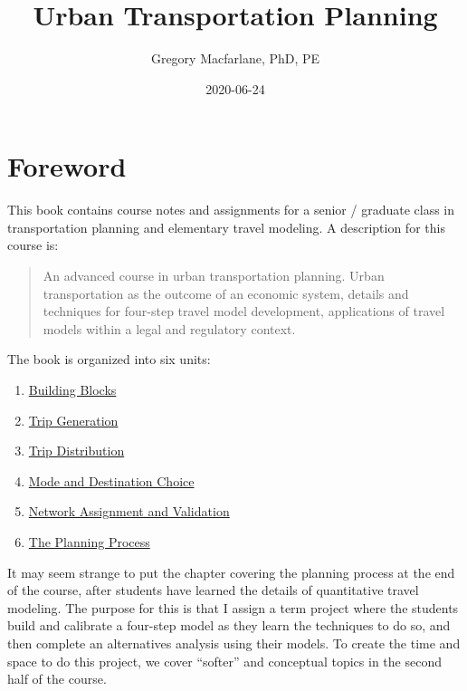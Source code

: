 \documentclass[
]{book}
\title{Urban Transportation Planning}
\author{Gregory Macfarlane, PhD, PE}
\date{2020-06-24}
\providecommand{\tightlist}{%
  \setlength{\itemsep}{0pt}\setlength{\parskip}{0pt}}
\begin{document}
\maketitle

{
\setcounter{tocdepth}{1}
\tableofcontents
}
\hypertarget{syllabus}{%
\chapter*{Foreword}\label{syllabus}}

This book contains course notes and assignments for a senior / graduate class in
transportation planning and elementary travel modeling. A description for this course
is:

\begin{quote}
An advanced course in urban transportation planning. Urban transportation as
the outcome of an economic system, details and techniques for four-step travel
model development, applications of travel models within a legal and regulatory
context.
\end{quote}

The book is organized into six units:

\begin{enumerate}
\def\labelenumi{\arabic{enumi}.}
\tightlist
\item
  \protect\hyperlink{chap-blocks}{Building Blocks}
\item
  \protect\hyperlink{chap-tripgen}{Trip Generation}
\item
  \protect\hyperlink{chap-distribution}{Trip Distribution}
\item
  \protect\hyperlink{chap-modechoice}{Mode and Destination Choice}
\item
  \protect\hyperlink{chap-assignment}{Network Assignment and Validation}
\item
  \protect\hyperlink{chap-process}{The Planning Process}
\end{enumerate}

It may seem strange to put the chapter covering the planning process at the end
of the course, after students have learned the details of quantitative travel
modeling. The purpose for this is that I assign a term project where the
students build and calibrate a four-step model as they learn the techniques to do
so, and then complete an alternatives analysis using their models. To create
the time and space to do this project, we cover ``softer'' and conceptual topics
in the second half of the course.
\end{document}

